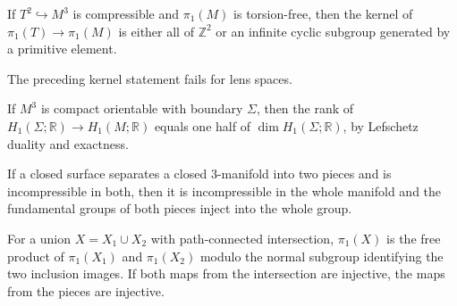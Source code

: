 \begin{lemma}
\label{lem:chow-iv-compressible-torus-kernel}

If \(T^2\hookrightarrow M^3\) is compressible and \(\pi_1(M)\) is torsion-free,
then the kernel of \(\pi_1(T)\to\pi_1(M)\) is either all of \(\mathbb Z^2\) or
an infinite cyclic subgroup generated by a primitive element.
\end{lemma}

\begin{remark}
\label{rem:chow-iv-compressible-torus-lens-space}

The preceding kernel statement fails for lens spaces.
\end{remark}

\begin{lemma}
\label{lem:chow-iv-boundary-h1-rank}

If \(M^3\) is compact orientable with boundary \(\Sigma\), then the rank of
\(H_1(\Sigma;\mathbb R)\to H_1(M;\mathbb R)\) equals one half of
\(\dim H_1(\Sigma;\mathbb R)\), by Lefschetz duality and exactness.
\end{lemma}

\begin{lemma}
\label{lem:chow-iv-separating-incompressible-surfaces}

If a closed surface separates a closed 3-manifold into two pieces and is
incompressible in both, then it is incompressible in the whole manifold and the
fundamental groups of both pieces inject into the whole group.
\end{lemma}

\begin{theorem}
\label{thm:chow-iv-seifert-van-kampen}

For a union \(X=X_1\cup X_2\) with path-connected intersection,
\(\pi_1(X)\) is the free product of \(\pi_1(X_1)\) and \(\pi_1(X_2)\) modulo
the normal subgroup identifying the two inclusion images.  If both maps from
the intersection are injective, the maps from the pieces are injective.
\end{theorem}

